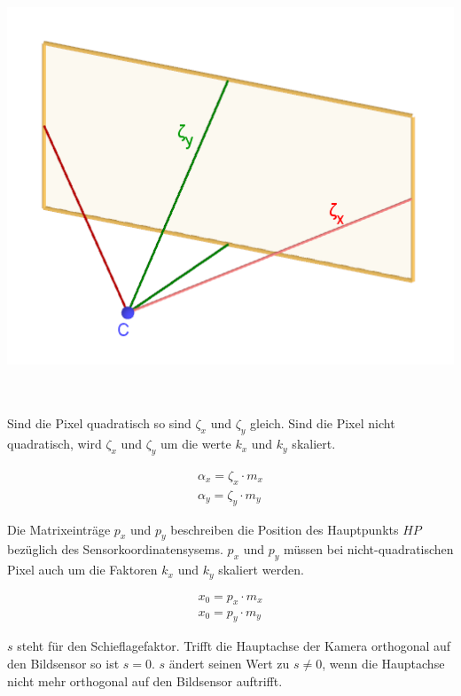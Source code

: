 \begin{minipage}{\linewidth}
	\centering
	\includegraphics[width=.6\linewidth]{images/FocalLengthExplanation.png}
	\label{fig:focalLengthErklaerung}
\end{minipage}\\\\

Sind die Pixel quadratisch so sind $\zeta_x$ und $\zeta_y$ gleich. Sind die Pixel nicht quadratisch, wird $\zeta_x$ und $\zeta_y$ um die werte $k_x$ und $k_y$ skaliert\cite{HZ}.

\begin{gather*}
	\alpha_x = \zeta_x \cdot m_x\\
	\alpha_y = \zeta_y \cdot m_y
\end{gather*}

Die Matrixeinträge $p_x$ und $p_y$ beschreiben die Position des Hauptpunkts $HP$ bezüglich des Sensorkoordinatensysems. $p_x$ und $p_y$ müssen bei nicht-quadratischen Pixel auch um die Faktoren $k_x$ und $k_y$ skaliert werden\cite{HZ}.

\begin{gather}
	x_{0} = p_x \cdot m_x\\
	x_{0} = p_y \cdot m_y
\end{gather}

$s$ steht für den Schieflagefaktor. Trifft die Hauptachse der Kamera orthogonal auf den Bildsensor so ist $s = 0$. $s$ ändert seinen Wert zu $s \neq 0$, wenn die Hauptachse nicht mehr orthogonal auf den Bildsensor auftrifft\cite{HZ}. 

